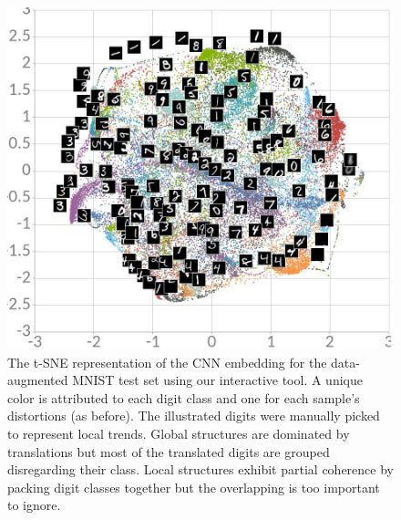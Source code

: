 \documentclass[a4paper,12pt]{report}
\begin{document}
\begin{figure}[t]
    \begin{center}
        \includegraphics[width=\textwidth]{thesis_figures/mnist_da_tsne.jpg}
    \end{center}
    \caption{The t-SNE representation of the CNN embedding for the data-augmented MNIST test set using our interactive tool.
    A unique color is attributed to each digit class and one for each sample's distortions (as before).
    The illustrated digits were manually picked to represent local trends.
    Global structures are dominated by translations but most of the translated digits are grouped disregarding their class.
    Local structures exhibit partial coherence by packing digit classes together but the overlapping is too important to ignore.
    }
    \label{fig:mnist_da_tsne}
\end{figure}
\end{document}
